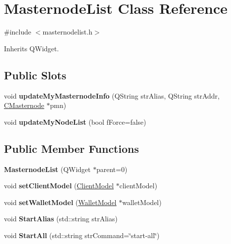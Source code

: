 \hypertarget{class_masternode_list}{}\section{Masternode\+List Class Reference}
\label{class_masternode_list}


{\ttfamily \#include $<$masternodelist.\+h$>$}



Inherits Q\+Widget.

\subsection*{Public Slots}
\begin{DoxyCompactItemize}
\item 
\mbox{\label{class_masternode_list_aab24be7fcf713ad32d557e163cbd3d8d}} 
void {\bfseries update\+My\+Masternode\+Info} (Q\+String str\+Alias, Q\+String str\+Addr, \mbox{\hyperlink{class_c_masternode}{C\+Masternode}} $\ast$pmn)
\item 
\mbox{\label{class_masternode_list_abfb8462c699669f75f7a8005089bdb0a}} 
void {\bfseries update\+My\+Node\+List} (bool f\+Force=false)
\end{DoxyCompactItemize}
\subsection*{Public Member Functions}
\begin{DoxyCompactItemize}
\item 
\mbox{\label{class_masternode_list_a341c2ce3e55eecb90f8733c72af375c4}} 
{\bfseries Masternode\+List} (Q\+Widget $\ast$parent=0)
\item 
\mbox{\label{class_masternode_list_af6885a9a952f5655079edc15c778281f}} 
void {\bfseries set\+Client\+Model} (\mbox{\hyperlink{class_client_model}{Client\+Model}} $\ast$client\+Model)
\item 
\mbox{\label{class_masternode_list_a42afb5ddc88eb11982f25b518f3477c6}} 
void {\bfseries set\+Wallet\+Model} (\mbox{\hyperlink{class_wallet_model}{Wallet\+Model}} $\ast$wallet\+Model)
\item 
\mbox{\label{class_masternode_list_ab3a42d1c66f3b28e9843335d8ce0178d}} 
void {\bfseries Start\+Alias} (std\+::string str\+Alias)
\item 
\mbox{\label{class_masternode_list_a0ebd5301adf7567e6a82550ba6d02ccc}} 
void {\bfseries Start\+All} (std\+::string str\+Command=\char`\"{}start-\/all\char`\"{})
\end{DoxyCompactItemize}


